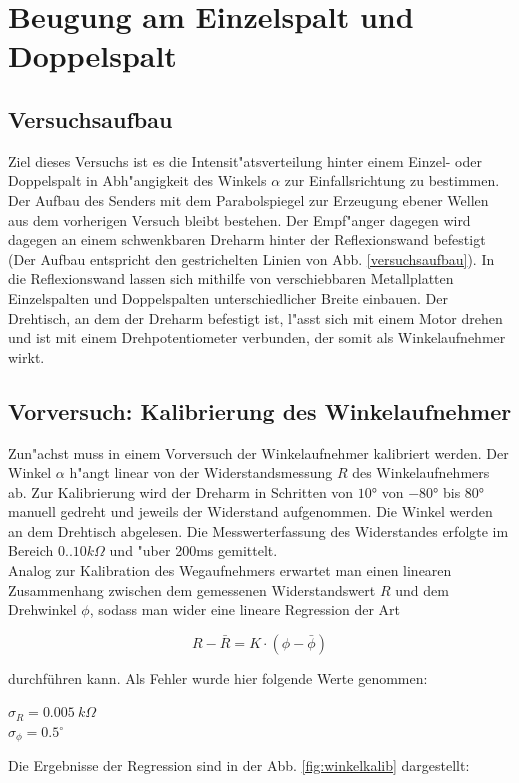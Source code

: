 \documentclass[12pt,a4paper]{article}
\begin{document}
\section{Beugung am Einzelspalt und Doppelspalt}

\subsection{Versuchsaufbau}
Ziel dieses Versuchs ist es die Intensit"atsverteilung hinter einem Einzel- oder Doppelspalt in Abh"angigkeit des Winkels $\alpha$ zur Einfallsrichtung zu bestimmen. Der Aufbau des Senders mit dem Parabolspiegel zur Erzeugung ebener Wellen aus dem vorherigen Versuch bleibt bestehen. Der Empf"anger dagegen wird dagegen an einem schwenkbaren Dreharm hinter der Reflexionswand befestigt (Der Aufbau entspricht den gestrichelten Linien von Abb. \ref{versuchsaufbau}). In die Reflexionswand lassen sich mithilfe von verschiebbaren Metallplatten Einzelspalten und Doppelspalten unterschiedlicher Breite einbauen. Der Drehtisch, an dem der Dreharm befestigt ist, l"asst sich mit einem Motor drehen und ist mit einem Drehpotentiometer verbunden, der somit als Winkelaufnehmer wirkt. 

\subsection{Vorversuch: Kalibrierung des Winkelaufnehmer}
Zun"achst muss in einem Vorversuch der Winkelaufnehmer kalibriert werden. Der Winkel $\alpha$ h"angt linear von der Widerstandsmessung $R$ des Winkelaufnehmers ab. Zur Kalibrierung wird der Dreharm in Schritten von $\ang{10}$ von $\ang{-80}$ bis $\ang{80}$ manuell gedreht und jeweils der Widerstand aufgenommen. Die Winkel werden an dem Drehtisch abgelesen. Die Messwerterfassung des Widerstandes erfolgte im Bereich $0..10k\Omega$ und "uber 200ms gemittelt.\\
Analog zur Kalibration des Wegaufnehmers erwartet man einen linearen Zusammenhang zwischen dem gemessenen Widerstandswert $R$ und dem Drehwinkel $\phi$, sodass man wider eine lineare Regression der Art

\begin{equation}
	R-\bar{R}=K\cdot(\phi-\bar{\phi})
\end{equation}

durchführen kann. Als Fehler wurde hier folgende Werte genommen:
\begin{center}
	$\sigma_R = \SI{0.005}{k \Omega}$\\
	$\sigma_{\phi} = 0.5^\circ$
\end{center}
Die Ergebnisse der Regression sind in der Abb. \ref{fig:winkelkalib} dargestellt:
\end{document}
